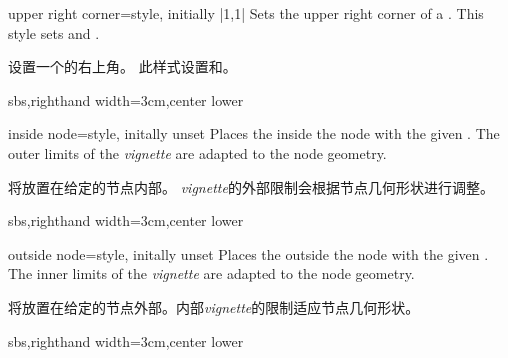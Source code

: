 \begin{vigTcbKey}[][doc new=2016-04-22]{upper right corner}{=}{style, initially |1,1|}
Sets the upper right corner of a .
This style sets  and .

设置一个的右上角。 此样式设置和。
\end{vigTcbKey}


\begin{dispExample*}{sbs,righthand width=3cm,center lower}
\end{dispExample*}

\enlargethispage*{1cm}

\begin{vigTcbKey}[][doc new=2016-04-22]{inside node}{=}{style, initally unset}
Places the  inside the node with the given .
The outer limits of the \emph{vignette} are adapted to the node geometry.

将放置在给定的节点内部。 \emph{vignette}的外部限制会根据节点几何形状进行调整。
\begin{dispExample*}{sbs,righthand width=3cm,center lower}
\end{dispExample*}
\end{vigTcbKey}

\begin{vigTcbKey}[][doc new=2016-04-22]{outside node}{=}{style, initally unset}
Places the  outside the node with the given .
The inner limits of the \emph{vignette} are adapted to the node geometry.

将放置在给定的节点外部。内部\emph{vignette}的限制适应节点几何形状。
\begin{dispExample*}{sbs,righthand width=3cm,center lower}
\end{dispExample*}
\end{vigTcbKey}


